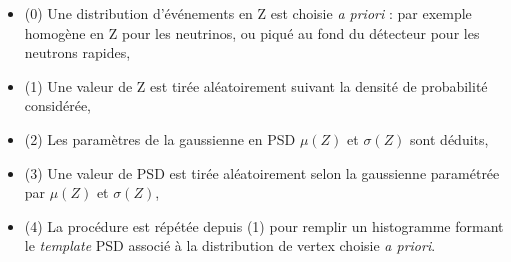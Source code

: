 
\begin{itemize}[label=$\bullet$]
    \item (0) Une distribution d'événements en Z est choisie \textit{a priori} : par exemple homogène en Z pour les neutrinos, ou piqué au fond du détecteur pour les neutrons rapides,
    \item (1) Une valeur de Z est tirée aléatoirement suivant la densité de probabilité considérée,
    \item (2) Les paramètres de la gaussienne en PSD $\mu(Z)$ et $\sigma(Z)$ sont déduits,
    \item (3) Une valeur de PSD est tirée aléatoirement selon la gaussienne paramétrée par $\mu(Z)$ et $\sigma(Z)$,
    \item (4) La procédure est répétée depuis (1) pour remplir un histogramme formant le \textit{template} PSD associé à la distribution de vertex choisie \textit{a priori}.
\end{itemize}

